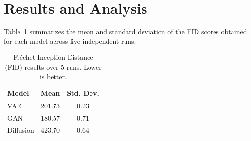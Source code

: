 \section{Results and Analysis}

Table~\ref{tab:fid-scores} summarizes the mean and standard deviation of the FID scores obtained for each model across five independent runs.

\begin{table}[h]
\centering
\caption{Fréchet Inception Distance (FID) results over 5 runs. Lower is better.}\label{tab:fid-scores}
\begin{tabular}{lcc}
\toprule
\textbf{Model} & \textbf{Mean} & \textbf{Std. Dev.} \\
\midrule
VAE        & 201.73 & 0.23 \\
GAN        & 180.57 & 0.71 \\
Diffusion  & 423.70 & 0.64 \\
\bottomrule
\end{tabular}
\end{table}

